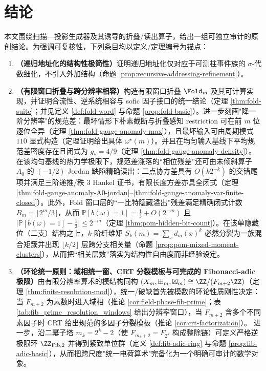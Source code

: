 \section{结论}

本文围绕扫描—投影生成器及其诱导的折叠/读出算子，给出一组可独立审计的原创结论。为强调可复核性，下列条目均以定义/定理编号为锚点：
\begin{enumerate}
  \item \textbf{（递归地址化的结构性极简性）}证明递归地址化仅对应于可测柱事件族的 $\sigma$-代数细化，不引入外加结构（命题 \ref{prop:recursive-addressing-refinement}）。
  \item \textbf{（有限窗口折叠与跨分辨率相容）}构造有限窗口折叠 $\Fold_m$ 及其可计算实现，并证明合流性、逆系统相容与 sofic 因子接口的统一结论（定理 \ref{thm:fold-suite}；并见定义 \ref{def:fold-word} 与命题 \ref{prop:fold-basic}）。进一步刻画"降一阶分辨率"的规范差：最坏情形下朴素截断与折叠感知 restriction 可在前 $m$ 位逐位全异（定理 \ref{thm:fold-gauge-anomaly-max}），且最坏输入可由周期模式 \(110\) 显式构造（定理证明给出具体 \(\omega^\star(m)\)）。并且在均匀输入基线下平均规范差密度存在且闭式为 \(g_\ast=4/9\)（定理 \ref{thm:fold-gauge-anomaly-density}）。在该均匀基线的热力学极限下，规范差涨落的“相位残差”还可由未倾斜算子 $A_0$ 的 $(-1/2)$ Jordan 缺陷精确读出：二点协方差具有 $O(k2^{-k})$ 的交错尾项并满足三阶递推/秩 $3$ Hankel 证书，有限长度方差亦具全闭式（定理 \ref{thm:fold-gauge-anomaly-A0-jordan}--\ref{thm:fold-gauge-anomaly-var-finite-closed}）。此外，Fold 窗口层的“一比特隐藏溢出”残差满足精确闭式计数 \(B_m=\lfloor 2^m/3\rfloor\)，从而 \(\mathbb{P}[b(\omega)=1]=\frac13+O(2^{-m})\) 且 \(\bigl|\mathbb{P}[b(\omega)=1]-\frac13\bigr|\le 2^{-m}\)（定理 \ref{thm:pom-hidden-bit-count}）。在该单隐藏位（二支）结构之上，\(k\)-阶纤维矩 \(S_k(m)=\sum_x d_m(x)^k\) 必然分裂为一族混合矩簇并出现 \(\lfloor k/2\rfloor\) 层跨分支相关量（命题 \ref{prop:pom-mixed-moment-clusters}），从而把“相关层数”落实为结构性自由度而非经验设定。
  \item \textbf{（环论统一原则：域相统一窗、CRT 分裂模板与可完成的 Fibonacci-adic 极限）}由有限分辨率算术的模结构同构
  $(X_m,\boxplus_m,\boxtimes_m)\cong \ZZ/(F_{m+2}\ZZ)$（定理 \ref{thm:finite-resolution-mod}），统一/破缺首先被模数的环论性质刚性决定：当 $F_{m+2}$ 为素数时进入域相（推论 \ref{cor:field-phase-fib-prime}；表 \ref{tab:fib_prime_resolution_windows} 给出分辨率窗口），当 $F_{m+2}$ 含多个不同素因子时 CRT 给出规范的多因子分裂模板（推论 \ref{cor:crt-factorization}）。
  进一步，沿二幂子塔 $m_k=2^k-2$（使 $F_{m_k+2}=F_{2^k}$ 构成整除链）可定义严格逆极限环 $\ZZ_{\mathrm{Fib},2}$ 并得到紧致单位群（定义 \ref{def:fib-adic-ring} 与命题 \ref{prop:fib-adic-basic}），从而把跨尺度"统一电荷算术"完备化为一个明确可审计的数学对象。

\end{enumerate}
